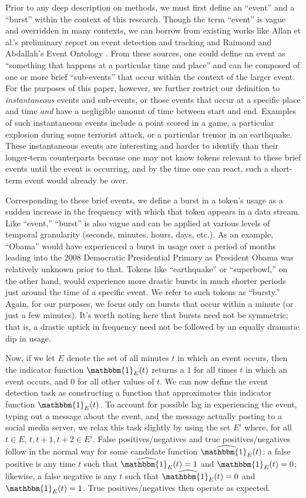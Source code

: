 \documentclass{acm_proc_article-sp}
\begin{document}
Prior to any deep description on methods, we must first define an ``event'' and a ``burst'' within the context of this research.
Though the term ``event'' is vague and overridden in many contexts, we can borrow from existing works like Allan et al.'s preliminary report on event detection and tracking and Raimond and Abdallah's Event Ontology \cite{Raimond2007,allan1998line}.
From these sources, one could define an event as ``something that happens at a particular time and place'' and can be composed of one or more brief ``sub-events'' that occur within the context of the larger event.
For the purposes of this paper, however, we further restrict our definition to \emph{instantaneous} events and sub-events, or those events that occur at a specific place and time \emph{and} have a negligible amount of time between start and end.
Examples of such instantaneous events include a point scored in a game, a particular explosion during some terrorist attack, or a particular tremor in an earthquake.
These instantaneous events are interesting and harder to identify than their longer-term counterparts because one may not know tokens relevant to these brief events until the event is occurring, and by the time one can react, such a short-term event would already be over. 

Corresponding to these brief events, we define a burst in a token's usage as a sudden increase in the frequency with which that token appears in a data stream.
Like ``event,'' ``burst'' is also vague and can be applied at various levels of temporal granularity (seconds, minutes, hours, days, etc.).
As an example, ``Obama'' would have experienced a burst in usage over a period of months leading into the 2008 Democratic Presidential Primary as President Obama was relatively unknown prior to that. 
Tokens like ``earthquake'' or ``superbowl,'' on the other hand, would experience more drastic bursts in much shorter periods just around the time of a specific event.
We refer to such tokens as ``bursty.''
Again, for our purposes, we focus only on bursts that occur within a minute (or just a few minutes). 
It's worth noting here that bursts need not be symmetric; that is, a drastic uptick in frequency need not be followed by an equally dramatic dip in usage.

Now, if we let $E$ denote the set of all minutes $t$ in which an event occurs, then the indicator function $\mathbbm{1}_E(t)$ returns a $1$ for all times $t$ in which an event occurs, and $0$ for all other values of $t$. 
We can now define the event detection task as constructing a function that approximates this indicator function $\mathbbm{1}_E(t)$.
To account for possible lag in experiencing the event, typing out a message about the event, and the message actually posting to a social media server, we relax this task slightly by using the set $E'$ where, for all $t \in E$, $t, t+1, t+2 \in E'$.
False positives/negatives and true positives/negatives follow in the normal way for some candidate function $\widehat{\mathbbm{1}_E}(t)$: a false positive is any time $t$ such that $\widehat{\mathbbm{1}_E}(t) = 1$ and ${\mathbbm{1}_E}(t) = 0$; likewise, a false negative is any $t$ such that $\widehat{\mathbbm{1}_E}(t) = 0$ and ${\mathbbm{1}_E}(t) = 1$.
True positives/negatives then operate as expected.
\end{document}
